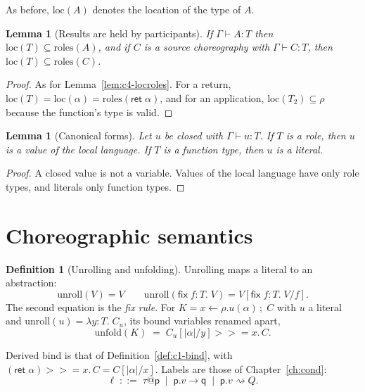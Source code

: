 \documentclass[11pt]{report}
\makeatletter
\theoremstyle{plain}
\newtheorem{lemma}[theorem]{Lemma}
\theoremstyle{definition}
\newtheorem{definition}[theorem]{Definition}
\theoremstyle{remark}
\newcommand{\kw}[1]{\mathsf{#1}}
\newcommand{\pp}{\mathsf{p}}
\newcommand{\qq}{\mathsf{q}}
\newcommand{\bind}[3]{#1 \leftarrow #2\,;\;#3}
\newcommand{\cret}[1]{\kw{ret}\;#1}
\newcommand{\com}[3]{#1.#2 \to #3}
\newcommand{\mbind}[3]{#1 \mathbin{>\!\!>\!\!=} #2.\,#3}
\newcommand{\unfold}[1]{\mathrm{unfold}(#1)}
\newcommand{\roles}[1]{\mathrm{roles}(#1)}
\newcommand{\loc}[1]{\mathrm{loc}(#1)}
\newcommand{\pay}[1]{\lvert #1\rvert}
\newcommand{\tauat}[1]{\tau\mathord{@}#1}
\newcommand{\castlbl}[3]{#1.#2 \rightsquigarrow #3}
\newcommand{\clam}[3]{\lambda #1{:}#2.\;#3}
\newcommand{\cfix}[3]{\kw{fix}\;#1{:}#2.\;#3}
\newcommand{\unroll}[1]{\mathrm{unroll}(#1)}
\makeatother
\begin{document}
As before, $\loc{A}$ denotes the location of the type of $A$.

\begin{lemma}[Results are held by participants]\label{lem:c5-locroles}
  If $\Gamma\vdash A:T$ then $\loc{T}\subseteq\roles{A}$, and if $C$ is a
  source choreography with $\Gamma\vdash C:T$, then
  $\loc{T}\subseteq\roles{C}$.
\end{lemma}
\begin{proof}
  As for Lemma~\ref{lem:c4-locroles}.  For a return,
  $\loc{T}=\loc{\alpha}=\roles{\cret{\alpha}}$, and for an application,
  $\loc{T_2}\subseteq\rho$ because the function's type is valid.
\end{proof}

\begin{lemma}[Canonical forms]\label{lem:c5-canon}
  Let $u$ be closed with $\Gamma\vdash u:T$.  If $T$ is a role, then $u$ is
  a value of the local language.  If $T$ is a function type, then $u$ is a
  literal.
\end{lemma}
\begin{proof}
  A closed value is not a variable.  Values of the local language have only
  role types, and literals only function types.
\end{proof}

\section{Choreographic semantics}
\label{sec:c5-sem}

\begin{definition}[Unrolling and unfolding]\label{def:c5-unfold}
  Unrolling maps a literal to an abstraction:
  \[
    \unroll{V} = V
    \qquad
    \unroll{\cfix{f}{T}{V}} = V[\cfix{f}{T}{V}/f].
  \]
  The second equation is the \emph{fix rule}.  For
  $K=\bind{x}{\rho.u(\alpha)}{C}$ with $u$ a literal and
  $\unroll{u}=\clam{y}{T}{C_u}$, its bound variables renamed apart,
  \[
    \unfold{K} \;=\; \mbind{C_u[\pay{\alpha}/y]}{x}{C}.
  \]
\end{definition}

Derived bind is that of Definition~\ref{def:c1-bind}, with
$\mbind{(\cret{\alpha})}{x}{C}=C[\pay{\alpha}/x]$.  Labels are those of
Chapter~\ref{ch:cond}:
\[
  \ell \;::=\; \tauat{\pp} \;\mid\; \com{\pp}{v}{\qq} \;\mid\; \castlbl{\pp}{v}{Q}.
\]
\end{document}
